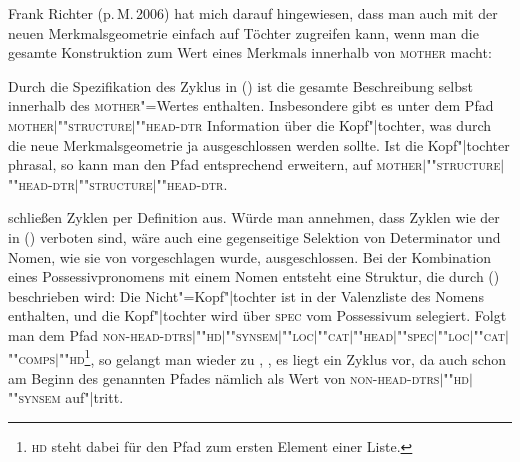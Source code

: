 Frank Richter (p.\,M.\,2006) hat mich darauf hingewiesen, dass man auch mit
der neuen Merkmalsgeometrie einfach auf Töchter zugreifen kann, wenn man die gesamte Konstruktion
zum Wert eines Merkmals innerhalb von \textsc{mother} macht:

\ea
{} 
\z
Durch die Spezifikation des Zyklus in () ist die gesamte Beschreibung selbst innerhalb des
\textsc{mother}"=Wertes enthalten. Insbesondere gibt es unter dem Pfad \textsc{mother$|$""struc\-ture$|$""head-dtr} Information über die Kopf"|tochter, was durch die neue
Merkmalsgeometrie ja ausgeschlossen werden sollte. Ist die Kopf"|tochter phrasal, so kann man den Pfad
entsprechend erweitern, \zb auf  \textsc{mother$|$""struc\-ture$|$""head-dtr$|$""struc\-ture$|$""head-dtr}.

\citet[]{ps} schließen Zyklen per Definition aus. Würde man annehmen, dass
Zyklen wie der in () verboten sind, wäre auch eine gegenseitige Selektion von Determinator und Nomen, wie sie von
\citet[Abschnitt~1.8]{ps2} vorgeschlagen wurde, %
ausgeschlossen. Bei der Kombination eines Possessivpronomens mit einem Nomen entsteht eine Struktur, die durch ()
beschrieben wird:
\ea
{}
\z
Die Nicht"=Kopf"|tochter ist in der Valenzliste des Nomens enthalten, und die Kopf"|tochter wird
über \textsc{spec} vom Possessivum selegiert. Folgt man dem Pfad
\textsc{non-head-dtrs$|$""hd$|$""synsem$|$""loc$|$""cat$|$""head$|$""spec$|$""loc$|$""cat$|$""comps$|$""hd}\footnote{
  \textsc{hd} steht dabei für den Pfad zum ersten Element einer Liste.%
}, so gelangt man wieder zu , \dash, es liegt ein Zyklus vor, da  auch schon am
Beginn des genannten Pfades nämlich als Wert von \textsc{non-head-dtrs$|$""hd$|$""synsem} auf"|tritt.

